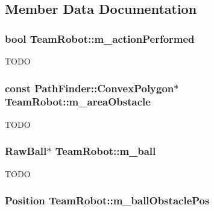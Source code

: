 \subsection{Member Data Documentation}
\hypertarget{classTeamRobot_ab98a148247f0c8bbadac3cfc8fa268c8}{
\subsubsection[{m\_\-actionPerformed}]{\setlength{\rightskip}{0pt plus 5cm}bool {\bf TeamRobot::m\_\-actionPerformed}}}
\label{classTeamRobot_ab98a148247f0c8bbadac3cfc8fa268c8}
TODO \hypertarget{classTeamRobot_af06d7a399ac2a3c24c27a7af1c6e38e5}{
\subsubsection[{m\_\-areaObstacle}]{\setlength{\rightskip}{0pt plus 5cm}const {\bf PathFinder::ConvexPolygon}$\ast$ {\bf TeamRobot::m\_\-areaObstacle}}}
\label{classTeamRobot_af06d7a399ac2a3c24c27a7af1c6e38e5}
TODO \hypertarget{classTeamRobot_ac6544ce7a73fe05e3c9a69cc50b58bbe}{
\subsubsection[{m\_\-ball}]{\setlength{\rightskip}{0pt plus 5cm}RawBall$\ast$ {\bf TeamRobot::m\_\-ball}}}
\label{classTeamRobot_ac6544ce7a73fe05e3c9a69cc50b58bbe}
TODO \hypertarget{classTeamRobot_aba2294985cc9a1dc404271e29166da82}{
\subsubsection[{m\_\-ballObstaclePos}]{\setlength{\rightskip}{0pt plus 5cm}Position {\bf TeamRobot::m\_\-ballObstaclePos}}}
